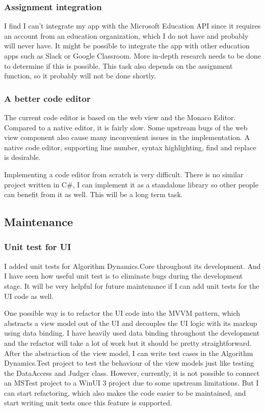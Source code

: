 \documentclass[report.tex]{subfiles}
\begin{document}
\subsubsection{Assignment integration}

I find I can't integrate my app with the Microsoft Education API since it requires an account from an education organization, which I do not have and probably will never have. It might be possible to integrate the app with other education apps such as Slack or Google Classroom. More in-depth research needs to be done to determine if this is possible. This task also depends on the assignment function, so it probably will not be done shortly.

\subsubsection{A better code editor}

The current code editor is based on the web view and the Monaco Editor. Compared to a native editor, it is fairly slow. Some upstream bugs of the web view component also cause many inconvenient issues in the implementation. A native code editor, supporting line number, syntax highlighting, find and replace is desirable.

Implementing a code editor from scratch is very difficult. There is no similar project written in C\#, I can implement it as a standalone library so other people can benefit from it as well. This will be a long term task.

\subsection{Maintenance}

\subsubsection{Unit test for UI}

I added unit tests for Algorithm Dynamics.Core throughout its development. And I have seen how useful unit test is to eliminate bugs during the development stage. It will be very helpful for future maintenance if I can add unit tests for the UI code as well.

One possible way is to refactor the UI code into the MVVM\cite{microsoft:docs:mvvm-introduction} pattern, which abstracts a view model out of the UI and decouples the UI logic with its markup using data binding\cite{microsoft:docs:data-binding-and-mvvm}. I have heavily used data binding throughout the development and the refactor will take a lot of work but it should be pretty straightforward. After the abstraction of the view model, I can write test cases in the Algorithm Dynamics.Test project to test the behaviour of the view models just like testing the DataAccess and Judger class. However, currently, it is not possible to connect an MSTest project to a WinUI 3 project due to some upstream limitations\cite{github:microsoft-ui-xaml:6258}. But I can start refactoring, which also makes the code easier to be maintained, and start writing unit tests once this feature is supported.
\end{document}
